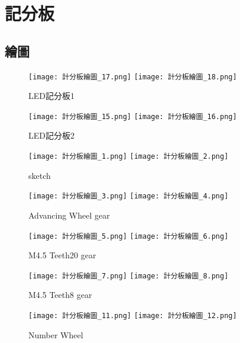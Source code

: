 \chapter{記分板}
\section{繪圖}
{
\begin{figure}[hbt!]
  \centering
  \texttt{[image: 計分板繪圖\_17.png]}
  \centering
  \texttt{[image: 計分板繪圖\_18.png]}
  \caption{LED記分板1}
  \label{fig:photo1}
\end{figure}

\begin{figure}[hbt!]
  \centering
  \texttt{[image: 計分板繪圖\_15.png]}
  \centering
  \texttt{[image: 計分板繪圖\_16.png]}
  \caption{LED記分板2}
  \label{fig:photo2}
\end{figure}

\begin{figure}[hbt!]
  \centering
  \texttt{[image: 計分板繪圖\_1.png]}
  \centering
  \texttt{[image: 計分板繪圖\_2.png]}
  \caption{sketch}
  \label{fig:photo3}
\end{figure}

\begin{figure}[hbt!]
  \centering
  \texttt{[image: 計分板繪圖\_3.png]}
  \centering
  \texttt{[image: 計分板繪圖\_4.png]}
  \caption{Advancing Wheel gear}
  \label{fig:photo4}
\end{figure}

\begin{figure}[hbt!]
  \centering
  \texttt{[image: 計分板繪圖\_5.png]}
  \centering
  \texttt{[image: 計分板繪圖\_6.png]}
  \caption{M4.5 Teeth20 gear}
  \label{fig:photo5}
\end{figure}

\begin{figure}[hbt!]
  \centering
  \texttt{[image: 計分板繪圖\_7.png]}
  \centering
  \texttt{[image: 計分板繪圖\_8.png]}
  \caption{M4.5 Teeth8 gear}
  \label{fig:photo6}
\end{figure}

\begin{figure}[hbt!]
  \centering
  \texttt{[image: 計分板繪圖\_11.png]}
  \centering
  \texttt{[image: 計分板繪圖\_12.png]}
  \caption{Number Wheel}
  \label{fig:photo7}
\end{figure}

}
